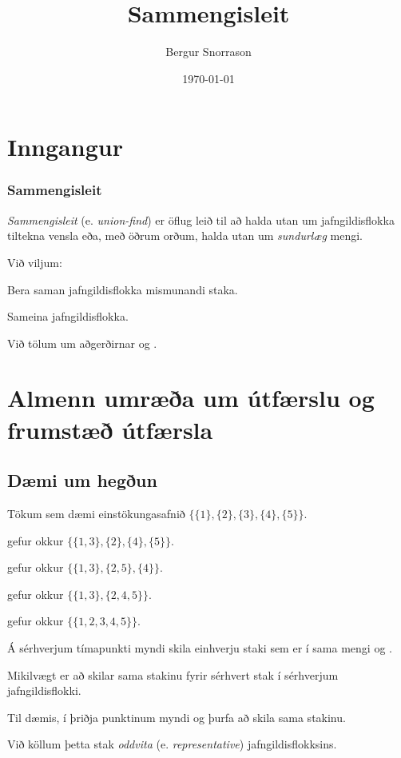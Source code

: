 \title{Sammengisleit}
\author{Bergur Snorrason}
\date{\today}



\frame{\titlepage}

\section{Inngangur}
{
	\frametitle{Sammengisleit}
	{
		\item<1-> \emph{Sammengisleit} (e. \emph{union-find}) er öflug leið til að halda utan um jafngildisflokka tiltekna vensla 
				eða, með öðrum orðum, halda utan um \emph{sundurlæg} mengi.
		\item<2-> Við viljum:
		{
			\item<3-> Bera saman jafngildisflokka mismunandi staka.
			\item<4-> Sameina jafngildisflokka.
		}
		\item<5-> Við tölum um aðgerðirnar  og .
	}
}

\section{Almenn umræða um útfærslu og frumstæð útfærsla}
\subsection{Dæmi um hegðun}
{
	{
		\item<1-> Tökum sem dæmi einstökungasafnið
			$\{\{1\}, \{2\}, \{3\}, \{4\}, \{5\}\}$. 
		\item<2->  gefur okkur
			$\{\{1, 3\}, \{2\}, \{4\}, \{5\}\}$. 
		\item<3->  gefur okkur
			$\{\{1, 3\}, \{2, 5\}, \{4\}\}$. 
		\item<4->  gefur okkur
			$\{\{1, 3\}, \{2, 4, 5\}\}$. 
		\item<5->  gefur okkur
			$\{\{1, 2, 3, 4, 5\}\}$. 
		\item<6-> Á sérhverjum tímapunkti myndi  skila einhverju staki sem er í sama mengi og .
		\item<7-> Mikilvægt er að  skilar sama stakinu fyrir sérhvert stak í sérhverjum jafngildisflokki.
		\item<8-> Til dæmis, í þriðja punktinum myndi  og  þurfa að skila sama stakinu.
		\item<9-> Við köllum þetta stak \emph{oddvita} (e. \emph{representative}) jafngildisflokksins.
	}
}

